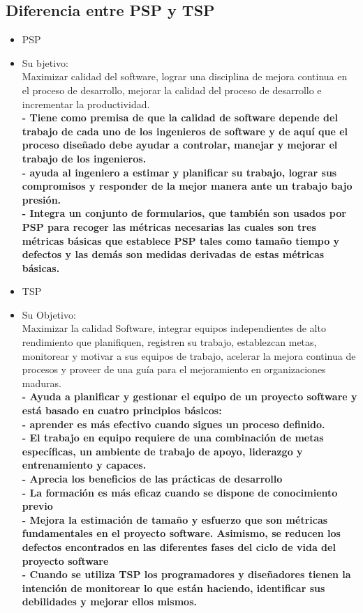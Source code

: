 \documentclass[twoside,twocolumn]{article}
\begin{document}
\subsection{Diferencia entre PSP y TSP}
\begin{itemize}
\item PSP
\item Su bjetivo:
\\Maximizar calidad del software, lograr una disciplina de mejora continua en el proceso de desarrollo, mejorar la calidad del proceso de desarrollo e incrementar la productividad.
\\ \textbf{- Tiene como premisa de que la calidad de software depende del trabajo de cada uno de los ingenieros de software y de aquí que el proceso diseñado debe ayudar a controlar, manejar y mejorar el trabajo de los ingenieros.}
\\ \textbf{- ayuda al ingeniero a estimar y planificar su trabajo, lograr sus compromisos y responder de la mejor manera ante un trabajo bajo presión.}
\\ \textbf{- Integra un conjunto de formularios, que también son usados por PSP para recoger las métricas necesarias las cuales son tres métricas básicas que establece PSP tales como tamaño tiempo y defectos y las demás son medidas derivadas de estas métricas básicas. }

\item TSP
\item Su Objetivo:
\\Maximizar la calidad Software, integrar equipos independientes de alto rendimiento que planifiquen, registren su trabajo, establezcan metas, monitorear y motivar a sus equipos de trabajo, acelerar la mejora continua de procesos y proveer de una guía para el mejoramiento en organizaciones maduras.
\\ \textbf{- Ayuda a planificar y gestionar el equipo de un proyecto software y está basado en cuatro principios básicos:}
\\ \textbf{-  aprender es más efectivo cuando sigues un proceso definido.}
\\ \textbf{- El trabajo en equipo requiere de una combinación de metas específicas, un ambiente de trabajo de apoyo, liderazgo y entrenamiento y capaces.}
\\ \textbf{- Aprecia los beneficios de las prácticas de desarrollo }
\\ \textbf{- La formación es más eficaz cuando se dispone de conocimiento previo}
\\ \textbf{- Mejora la estimación de tamaño y esfuerzo que son métricas fundamentales en el proyecto software. Asimismo, se reducen los defectos encontrados en las diferentes fases del ciclo de vida del proyecto software}
\\ \textbf{- Cuando se utiliza TSP los programadores y diseñadores tienen la intención de monitorear lo que están haciendo, identificar sus debilidades y mejorar ellos mismos. }
\end{itemize}
\end{document}

